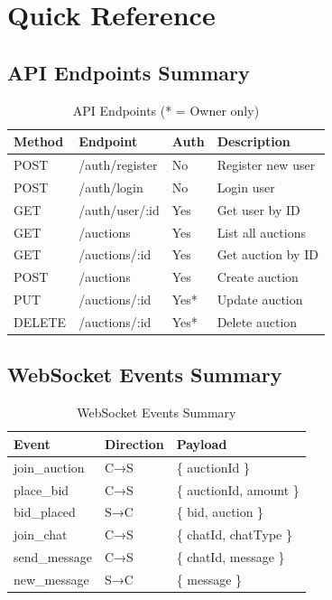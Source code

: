 \documentclass[12pt,a4paper]{report}
\begin{document}
\chapter{Quick Reference}

\section{API Endpoints Summary}

\begin{table}[H]
\centering
\begin{tabularx}{\textwidth}{|l|l|l|X|}
\hline
\textbf{Method} & \textbf{Endpoint} & \textbf{Auth} & \textbf{Description} \\
\hline
POST & /auth/register & No & Register new user \\
\hline
POST & /auth/login & No & Login user \\
\hline
GET & /auth/user/:id & Yes & Get user by ID \\
\hline
GET & /auctions & Yes & List all auctions \\
\hline
GET & /auctions/:id & Yes & Get auction by ID \\
\hline
POST & /auctions & Yes & Create auction \\
\hline
PUT & /auctions/:id & Yes* & Update auction \\
\hline
DELETE & /auctions/:id & Yes* & Delete auction \\
\hline
\end{tabularx}
\caption{API Endpoints (* = Owner only)}
\end{table}

\section{WebSocket Events Summary}

\begin{table}[H]
\centering
\begin{tabularx}{\textwidth}{|l|l|X|}
\hline
\textbf{Event} & \textbf{Direction} & \textbf{Payload} \\
\hline
join\_auction & C→S & \{ auctionId \} \\
\hline
place\_bid & C→S & \{ auctionId, amount \} \\
\hline
bid\_placed & S→C & \{ bid, auction \} \\
\hline
join\_chat & C→S & \{ chatId, chatType \} \\
\hline
send\_message & C→S & \{ chatId, message \} \\
\hline
new\_message & S→C & \{ message \} \\
\hline
\end{tabularx}
\caption{WebSocket Events Summary}
\end{table}
\end{document}
